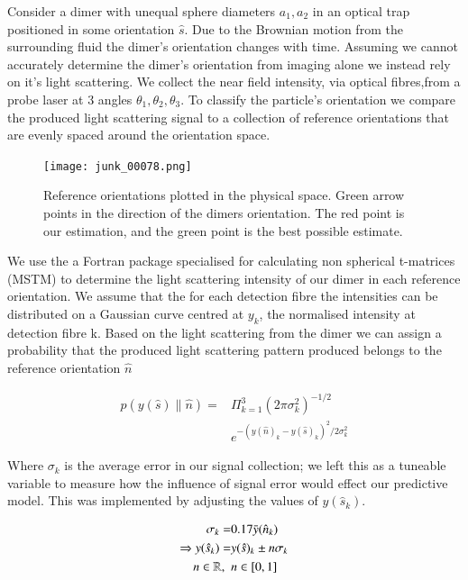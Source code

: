 \documentclass[final,3p, twocolumn]{elsarticle}
\begin{document}
Consider a dimer with unequal sphere diameters $a_1, a_2$ in an optical trap positioned in some orientation $\hat{s}$. Due to the Brownian motion from the surrounding fluid the dimer's orientation changes with time. Assuming we cannot accurately determine the dimer's orientation from imaging alone we instead rely on it's light scattering. We collect the near field intensity, via optical fibres,from a probe laser at 3 angles $\theta_1, \theta_2, \theta_3$. To classify the particle's orientation we compare the produced light scattering signal to a collection of reference orientations that are evenly spaced around the orientation space.

\begin{figure}[t]
	\centering
	\texttt{[image: junk\_00078.png]}
	\caption{Reference orientations plotted in the physical space. Green arrow points in the direction of the dimers orientation. The red point is our estimation, and the green point is the best possible estimate.}
\end{figure}

We use the a Fortran package specialised for calculating non spherical t-matrices (MSTM) \cite{Mishchenko1996MSTM} to determine the light scattering intensity of our dimer in each reference orientation. We assume that the for each detection fibre the intensities can be distributed on a Gaussian curve centred at $y_k$, the normalised intensity at detection fibre k. Based on the light scattering from the dimer we can assign a probability that the produced light scattering pattern produced belongs to the reference orientation $\hat{n}$

\begin{align}
	p(y(\hat{s})\parallel\hat{n}) =& \Pi^3_{k=1}
	(2\pi\sigma_k^2)^{-1/2} \nonumber \\     &e^{-(y(\hat{n})_k-y(\hat{s})_k)^2/2\sigma_k^2}
\end{align}

Where $\sigma_k$ is the average error in our signal collection; we left this as a tuneable variable to measure how the influence of signal error would effect our predictive model. This was implemented by adjusting the values of $y(\hat{s}_k)$. 

\begin{align}
	\centering
	\sigma_k =& 0.17\bar{y}(\hat{n}_k) \\
	\Rightarrow y(\hat{s}_k) =& y(\hat{s})_k \pm n\sigma_k \\ 
	n \in \mathbb{R}, \ \ & n\in[0,1] \nonumber
\end{align}
\end{document}
